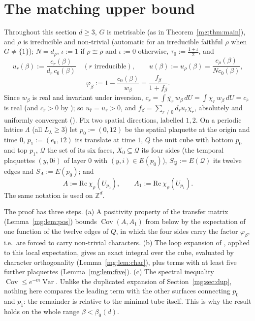 \documentclass[11pt,a4paper]{article}
\theoremstyle{definition}
\theoremstyle{remark}
\DeclareMathOperator{\Cov}{Cov}
\DeclareMathOperator{\Var}{Var}
\newcommand{\Z}{\mathbb{Z}}
\newcommand{\dU}{\,dU}
\newcommand{\Fref}[3]{\cite[#1~`#2' (\texttt{#3})]{F}}
\newcommand{\Flab}[2]{\cite[#1 \texttt{#2}]{F}}
\begin{document}
\section{The matching upper bound}\label{mg:sec:upper}

Throughout this section $d\ge3$, $G$ is metrisable (as in Theorem~\ref{mg:thm:main}), and $\rho$ is irreducible and non-trivial (automatic
for an irreducible faithful $\rho$ when $G\neq\{1\}$); $N=d_\rho$, $\iota:=1$ if $\rho\cong\bar\rho$ and $\iota:=0$ otherwise,
$\tau_0:=\frac{1+\iota}2$, and
\[
u_r(\beta):=\frac{c_r(\beta)}{d_r\,c_0(\beta)}\quad(r\text{ irreducible}),\qquad u(\beta):=u_\rho(\beta)=\frac{c_\rho(\beta)}{Nc_0(\beta)},
\]
\[
\varphi_\beta:=1-\frac{c_0(\beta)}{w_\beta}=\frac{f_\beta}{1+f_\beta}.
\]
Since $w_\beta$ is real and invariant under inversion, $c_r=\int\overline{\chi_r}\,w_\beta\dU=\int\chi_r\,w_\beta\dU=c_{\bar r}$ is real (and
$c_r>0$ by \Fref{Lemma}{Positivity of the character coefficients}{lem:cr}); so $u_{\bar r}=u_r>0$, and
$f_\beta=\sum_{r\neq0}d_ru_r\chi_r$, absolutely and uniformly convergent (\Flab{Corollary}{cor:uniform}).
Fix two spatial directions, labelled $1,2$. On a periodic lattice $\Lambda$ (all $L_\lambda\ge3$) let $p_0:=(0,12)$ be the spatial plaquette
at the origin and time $0$, $p_1:=(e_0,12)$ its translate at time $1$, $Q$ the unit cube with bottom $p_0$ and top $p_1$, $\mathcal Q$ the set of
its six faces, $X_0\subseteq\mathcal Q$ its four sides (the temporal plaquettes $(y,0i)$ of layer $0$ with $(y,i)\in E(p_0)$), $S_Q:=E(\mathcal Q)$ its
twelve edges and $S_A:=E(p_0)$; and
\[
A:=\mathrm{Re}\,\chi_\rho(U_{p_0}),\qquad A_1:=\mathrm{Re}\,\chi_\rho(U_{p_1}).
\]
The same notation is used on $\Z^d$.

The proof has three steps. (a) A positivity property of the transfer matrix (Lemma~\ref{mg:lem:pos}) bounds $\Cov(A,A_1)$ from below by
the expectation of one function of the twelve edges of $Q$, in which the four sides carry the factor $\varphi_\beta$, i.e.\ are forced to
carry non-trivial characters. (b) The loop expansion of \cite{III}, applied to this local expectation, gives an exact integral over the
cube, evaluated by character orthogonality (Lemma~\ref{mg:lem:char}), plus terms with at least five further plaquettes
(Lemma~\ref{mg:lem:five}). (c) The spectral inequality $\Cov\le e^{-m}\Var$. Unlike the duplicated expansion of Section~\ref{mg:sec:dup},
nothing here compares the leading term with the other surfaces connecting $p_0$ and $p_1$: the remainder is relative to the
minimal tube itself. This is why the result holds on the whole range $\beta<\beta_0(d)$.
\end{document}
